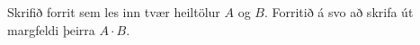 
Skrifið forrit sem les inn tvær heiltölur $A$ og $B$. Forritið á svo að skrifa
út margfeldi þeirra $A\cdot B$.
